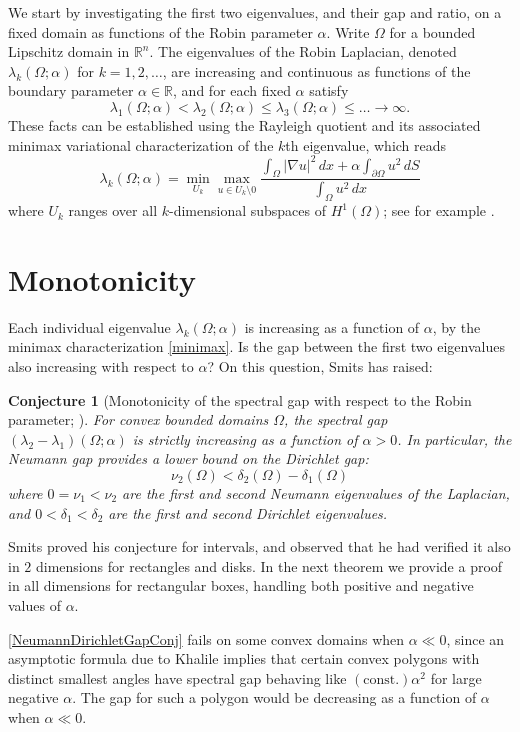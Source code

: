 \documentclass[12pt,reqno]{amsart}
\newtheorem{conjx}{Conjecture}
\theoremstyle{definition}
\newcommand{\R}{{\mathbb R}}
\newcommand{\Rn}{{\mathbb R}^n}
\begin{document}
We start by investigating the first two eigenvalues, and their gap and ratio, on a fixed domain as functions of the Robin parameter $\alpha$. Write $\Omega$ for a bounded Lipschitz domain in $\Rn$. The eigenvalues of the Robin Laplacian, denoted $\lambda_k(\Omega;\alpha)$ for $k=1,2,\dots$, are increasing and continuous as functions of the boundary parameter $\alpha \in \R$, and for each fixed $\alpha$ satisfy
\[
\lambda_1(\Omega;\alpha) < \lambda_2(\Omega;\alpha) \leq \lambda_3(\Omega;\alpha) \leq \dots \to \infty . 
\]
These facts can be established using the Rayleigh quotient and its associated minimax variational characterization of the $k$th eigenvalue, which reads
%
\begin{equation} \label{minimax}
\lambda_k(\Omega;\alpha) = \min_{U_k} \max_{u \in U_k \setminus 0} \frac{\int_\Omega |\nabla u|^2 \, dx + \alpha \int_{\partial \Omega} u^2 \, dS}{\int_\Omega u^2 \, dx} 
\end{equation}
%
where $U_k$ ranges over all $k$-dimensional subspaces of $H^1(\Omega)$; see for example \cite[{\S}4.2]{H17}.

\section*{Monotonicity} Each individual eigenvalue $\lambda_k(\Omega;\alpha)$ is increasing as a function of $\alpha$, by the minimax characterization \eqref{minimax}. Is the gap between the first two eigenvalues also increasing with respect to $\alpha$? On this question, Smits \cite{Sm96} has raised:
%
\begin{conjx}[Monotonicity of the spectral gap with respect to the Robin parameter;  ] \label{NeumannDirichletGapConj}
For convex bounded domains $\Omega$, the spectral gap $(\lambda_2-\lambda_1)(\Omega;\alpha)$ is strictly increasing as a function of $\alpha > 0$. In particular, the Neumann gap provides a lower bound on the Dirichlet gap:
\[
\nu_2(\Omega) < \delta_2(\Omega) - \delta_1(\Omega) 
\]
where $0 = \nu_1 < \nu_2$ are the first and second Neumann eigenvalues of the Laplacian, and $0<\delta_1 < \delta_2$ are the first and second Dirichlet eigenvalues. 
\end{conjx}
%
Smits proved his conjecture for intervals, and observed that he had verified it also in $2$ dimensions for rectangles and disks. In the next theorem we provide a proof in all dimensions for rectangular boxes, handling both positive and negative values of $\alpha$. 

\autoref{NeumannDirichletGapConj} fails on some convex domains when $\alpha \ll 0$, since an asymptotic formula due to Khalile \cite[Corollary 1.3]{Kh18} implies that certain convex polygons with distinct smallest angles have spectral gap behaving like $(\text{const.})\alpha^2$ for large negative $\alpha$. The gap for such a polygon would be decreasing as a function of $\alpha$ when $\alpha \ll 0$. 
\end{document}
